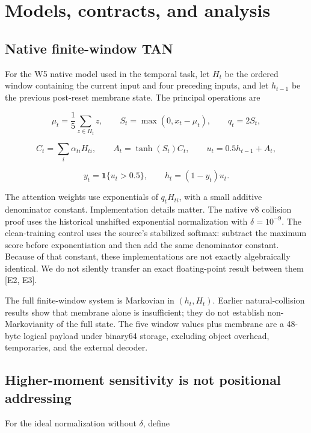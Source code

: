 \documentclass[
  10pt,
]{article}
\begin{document}
\section{Models, contracts, and
analysis}\label{models-contracts-and-analysis}

\subsection{Native finite-window TAN}\label{native-finite-window-tan}

For the W5 native model used in the temporal task, let \(H_t\) be the
ordered window containing the current input and four preceding inputs,
and let \(h_{t-1}\) be the previous post-reset membrane state. The
principal operations are

\[
\mu_t=\frac{1}{5}\sum_{z\in H_t}z,\qquad
S_t=\max(0,x_t-\mu_t),\qquad q_t=2S_t,
\]

\[
C_t=\sum_i\alpha_{ti}H_{ti},\qquad
A_t=\tanh(S_t)C_t,\qquad
u_t=0.5h_{t-1}+A_t,
\]

\[
y_t=\mathbf{1}\{u_t>0.5\},\qquad
h_t=(1-y_t)u_t.
\]

The attention weights use exponentials of \(q_tH_{ti}\), with a small
additive denominator constant. Implementation details matter. The native
v8 collision proof uses the historical unshifted exponential
normalization with \(\delta=10^{-9}\). The clean-training control uses
the source's stabilized softmax: subtract the maximum score before
exponentiation and then add the same denominator constant. Because of
that constant, these implementations are not exactly algebraically
identical. We do not silently transfer an exact floating-point result
between them {[}E2, E3{]}.

The full finite-window system is Markovian in \((h_t,H_t)\). Earlier
natural-collision results show that membrane alone is insufficient; they
do not establish non-Markovianity of the full state. The five window
values plus membrane are a 48-byte logical payload under binary64
storage, excluding object overhead, temporaries, and the external
decoder.

\subsection{Higher-moment sensitivity is not positional
addressing}\label{higher-moment-sensitivity-is-not-positional-addressing}

For the ideal normalization without \(\delta\), define
\end{document}

